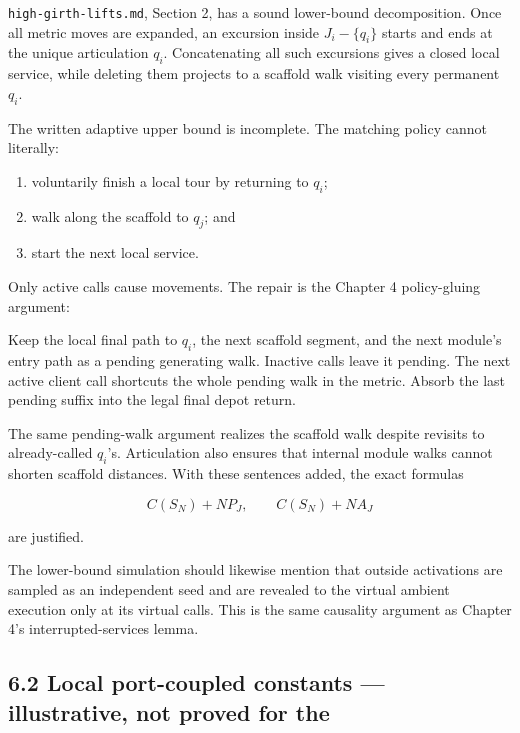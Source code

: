\documentclass[11pt,a4paper]{article}
\begin{document}
\nolinkurl{high-girth-lifts.md}, Section 2, has a sound lower-bound decomposition.  Once all metric moves are expanded, an excursion inside \(J_i-\{q_i\}\) starts and ends at the unique articulation \(q_i\).  Concatenating all such excursions gives a closed local service, while deleting them projects to a scaffold walk visiting every permanent \(q_i\).


The written adaptive upper bound is incomplete.  The matching policy cannot literally:


\begin{enumerate}

\item voluntarily finish a local tour by returning to \(q_i\);

\item walk along the scaffold to \(q_j\); and

\item start the next local service.

\end{enumerate}

Only active calls cause movements.  The repair is the Chapter 4 policy-gluing argument:


\begin{ResearchQuote}

Keep the local final path to \(q_i\), the next scaffold segment, and the next module's entry path as a pending generating walk.  Inactive calls leave it pending.  The next active client call shortcuts the whole pending walk in the metric.  Absorb the last pending suffix into the legal final depot return.

\end{ResearchQuote}

The same pending-walk argument realizes the scaffold walk despite revisits to already-called \(q_i\)'s.  Articulation also ensures that internal module walks cannot shorten scaffold distances.  With these sentences added, the exact formulas


\[
 C(S_N)+NP_J,\qquad C(S_N)+NA_J
\]

are justified.


The lower-bound simulation should likewise mention that outside activations are sampled as an independent seed and are revealed to the virtual ambient execution only at its virtual calls.  This is the same causality argument as Chapter 4's interrupted-services lemma.


\subsection*{6.2 Local port-coupled constants — illustrative, not proved for the}
\end{document}
